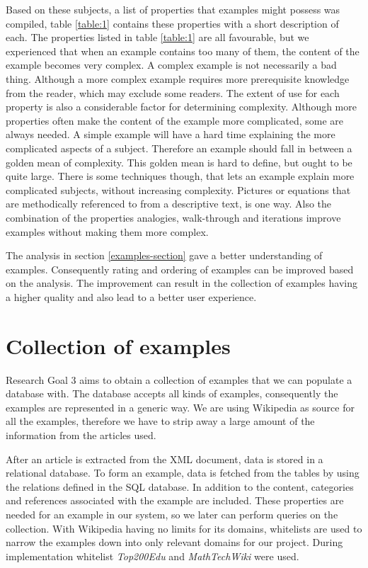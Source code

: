 Based on these subjects, a list of properties that examples might possess was compiled, table \ref{table:1} contains these properties with a short description of each. The properties listed in table \ref{table:1} are all favourable, but we experienced that when an example contains too many of them, the content of the example becomes very complex. A complex example is not necessarily a bad thing. Although a more complex example requires more prerequisite knowledge from the reader, which may exclude some readers. The extent of use for each property is also a considerable factor for determining complexity. Although more properties often make the content of the example more complicated, some are always needed. A simple example will have a hard time explaining the more complicated aspects of a subject. Therefore an example should fall in between a golden mean of complexity. This golden mean is hard to define, but ought to be quite large. There is some techniques though, that lets an example explain more complicated subjects, without increasing complexity. Pictures or equations that are methodically referenced to from a descriptive text, is one way. Also the combination of the properties analogies, walk-through and iterations improve examples without making them more complex. 

The analysis in section \ref{examples-section} gave a better understanding of examples. Consequently rating and ordering of examples can be improved based on the analysis. 
The improvement can result in the collection of examples having a higher quality and also lead to a better user experience. 


\section{Collection of examples} \label{5:exampleCollection}
Research Goal 3 aims to obtain a collection of examples that we can populate a database with. The database accepts all kinds of examples, consequently the examples are represented in a generic way. We are using Wikipedia as source for all the examples, therefore we have to strip away a large amount of the information from the articles used. 

After an article is extracted from the XML document, data is stored in a relational database. To form an example, data is fetched from the tables by using the relations defined in the SQL database. In addition to the content, categories and references associated with the example are included. These properties are needed for an example in our system, so we later can perform queries on the collection. With Wikipedia having no limits for its domains, whitelists are used to narrow the examples down into only relevant domains for our project. During implementation whitelist \textit{Top200Edu} and \textit{MathTechWiki} were used.

